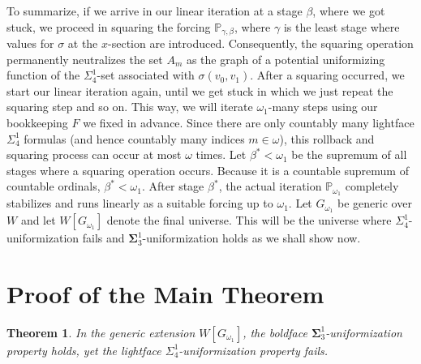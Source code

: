 \documentclass{article}
\theoremstyle{plain}
\newtheorem{theorem}{Theorem}[section]
\theoremstyle{definition}
\newcommand{\forceP}{\mathbb{P}}
\begin{document}
To summarize, if we arrive in our linear iteration at a stage $\beta$, where we got stuck, we proceed in squaring the forcing $\forceP_{\gamma,\beta}$, where $\gamma$ is the least stage where values for $\sigma$ at the $x$-section are introduced. Consequently,  the squaring operation permanently neutralizes the set $A_m$  as the graph of a  potential uniformizing function of the $\Sigma^1_4$-set associated with $\sigma(v_0,v_1)$. After a squaring occurred, we start our linear iteration again, until we get stuck in which we just repeat the squaring step and so on. This way, we will iterate $\omega_1$-many steps using our bookkeeping $F$ we fixed in advance. 
Since there are only countably many lightface $\Sigma^1_4$ formulas (and hence countably many indices $m \in \omega$), this rollback and squaring process can occur at most $\omega$ times. Let $\beta^* < \omega_1$ be the supremum of all stages where a squaring operation occurs. Because it is a countable supremum of countable ordinals, $\beta^* < \omega_1$. After stage $\beta^*$, the actual iteration $\mathbb{P}_{\omega_1}$ completely stabilizes and runs linearly as a suitable forcing up to $\omega_1$. Let $G_{\omega_1}$ be generic over $W$ and let $W[G_{\omega_1}]$ denote the final universe. This will be the universe where $\Sigma^1_4$-uniformization fails and $\boldsymbol{\Sigma}^1_3$-uniformization holds as we shall show now.



\section{Proof of the Main Theorem}

\begin{theorem} \label{MainTheorem}
In the generic extension $W[G_{\omega_1}]$, the boldface $\mathbf{\Sigma}^1_3$-uniformization property holds, yet the lightface $\Sigma^1_4$-uniformization property fails.
\end{theorem}
\end{document}
